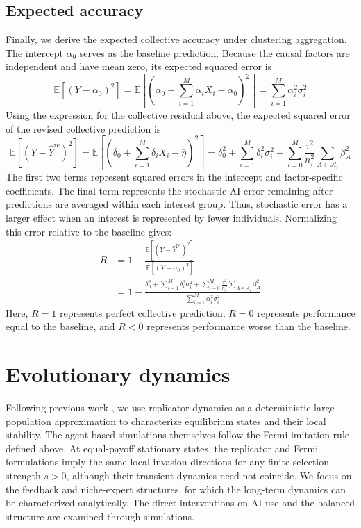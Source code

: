 \documentclass[12pt]{article}
\begin{document}
\subsection*{Expected accuracy}

Finally, we derive the expected collective accuracy under clustering aggregation. The intercept $\alpha_0$ serves as the baseline prediction. 
Because the causal factors are independent and have mean zero, its expected squared error is
\begin{equation}
\mathbb{E}[(Y - \alpha_0)^2] = \mathbb{E}\left[\left(\alpha_0 +\sum_{i = 1}^{M}\alpha_iX_i - \alpha_0\right)^2\right] = \sum_{i = 1}^{M}\alpha_i^2\sigma_i^2
\end{equation}
Using the expression for the collective residual above, the expected squared error of the revised collective prediction is
\begin{equation}
\mathbb{E}[(Y - \hat{Y}^{\mathrm{re}})^2] = \mathbb{E}\left[\left(\delta_0 +\sum_{i = 1}^{M}\delta_iX_i - \bar{\eta}\right)^2\right] = \delta_0^2 + \sum_{i = 1}^{M}\delta_i^2\sigma_i^2 + \sum_{i = 0}^{M}\frac{\tau^2}{n_i^2}\sum_{A \in \mathcal{A}_i}\beta_A^2
\end{equation}
The first two terms represent squared errors in the intercept and factor-specific coefficients. The final term represents the stochastic AI error remaining after predictions are averaged within each interest group. 
Thus, stochastic error has a larger effect when an interest is represented by fewer individuals. 
Normalizing this error relative to the baseline gives:
\begin{align}
R &= 1 - \frac{\mathbb{E}[(Y -  \hat{Y}^{re})^2]}{\mathbb{E}[(Y - \alpha_0)^2]}\\[6pt]
&= 1- \frac{\delta_0^2 + \sum_{i = 1}^{M}\delta_i^2\sigma_i^2 + \sum_{i = 0}^{M}\frac{\tau^2}{n_i^2}\sum_{A \in \mathcal{A}_i}\beta_A^2}{\sum_{i = 1}^{M}\alpha_i^2\sigma_i^2}
\end{align}
Here, $R=1$ represents perfect collective prediction, $R=0$ represents performance equal to the baseline, and $R<0$ represents performance worse than the baseline.

\section*{Evolutionary dynamics}

Following previous work \citep{wang2025individual,taylor1978evolutionary,traulsen2005coevolutionary}, we use replicator dynamics as a deterministic large-population approximation to characterize equilibrium states and their local stability.
The agent-based simulations themselves follow the Fermi imitation rule defined above.
At equal-payoff stationary states, the replicator and Fermi formulations imply the same local invasion directions for any finite selection strength $s>0$, although their transient dynamics need not coincide.
We focus on the feedback and niche-expert structures, for which the long-term dynamics can be characterized analytically. 
The direct interventions on AI use and the balanced structure are examined through simulations.
\end{document}
